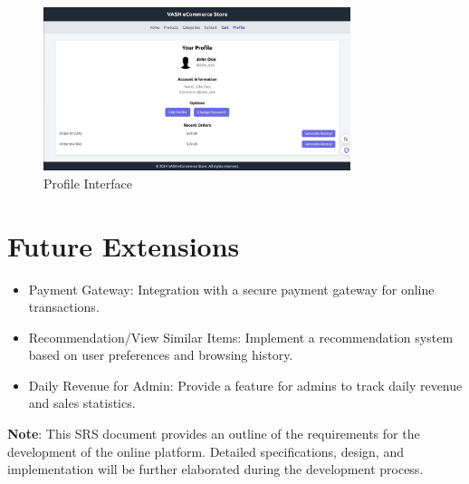 \documentclass{article}
\begin{document}
\vspace{1cm} %

\begin{figure}[h!] %
    \centering
    \includegraphics[width=0.8\textwidth]{profile.jpg} %
    \caption{Profile Interface} %
\end{figure}
\newpage
\section{Future Extensions}
\begin{itemize}[label=-]
    \item Payment Gateway: Integration with a secure payment gateway for online transactions.
    \item Recommendation/View Similar Items: Implement a recommendation system based on user preferences and browsing history.
    \item Daily Revenue for Admin: Provide a feature for admins to track daily revenue and sales statistics.
\end{itemize}

\textbf{Note}: This SRS document provides an outline of the requirements for the development of the online platform. Detailed specifications, design, and implementation will be further elaborated during the development process.
\end{document}
